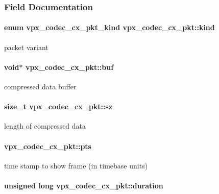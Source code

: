 \subsubsection{\-Field \-Documentation}
\hypertarget{structvpx__codec__cx__pkt_a41f395b39516343c1329a4a85a0084f2}{
\paragraph[{kind}]{\setlength{\rightskip}{0pt plus 5cm}enum {\bf vpx\-\_\-codec\-\_\-cx\-\_\-pkt\-\_\-kind} {\bf vpx\-\_\-codec\-\_\-cx\-\_\-pkt\-::kind}}}\label{structvpx__codec__cx__pkt_a41f395b39516343c1329a4a85a0084f2}
packet variant \hypertarget{structvpx__codec__cx__pkt_a9e1db068593b6037e70b05b5239784d2}{
\paragraph[{buf}]{\setlength{\rightskip}{0pt plus 5cm}void$\ast$ {\bf vpx\-\_\-codec\-\_\-cx\-\_\-pkt\-::buf}}}\label{structvpx__codec__cx__pkt_a9e1db068593b6037e70b05b5239784d2}
compressed data buffer \hypertarget{structvpx__codec__cx__pkt_a857321ba2dc65e81c430d14c36a542d9}{
\paragraph[{sz}]{\setlength{\rightskip}{0pt plus 5cm}size\-\_\-t {\bf vpx\-\_\-codec\-\_\-cx\-\_\-pkt\-::sz}}}\label{structvpx__codec__cx__pkt_a857321ba2dc65e81c430d14c36a542d9}
length of compressed data \hypertarget{structvpx__codec__cx__pkt_aa75fe039fe6b47fb25d20684864bef12}{
\paragraph[{pts}]{ {\bf vpx\-\_\-codec\-\_\-cx\-\_\-pkt\-::pts}}}\label{structvpx__codec__cx__pkt_aa75fe039fe6b47fb25d20684864bef12}
time stamp to show frame (in timebase units) \hypertarget{structvpx__codec__cx__pkt_afb8d9069980e759d97d2eb9fae7e5e06}{
\paragraph[{duration}]{\setlength{\rightskip}{0pt plus 5cm}unsigned long {\bf vpx\-\_\-codec\-\_\-cx\-\_\-pkt\-::duration}}}\label{structvpx__codec__cx__pkt_afb8d9069980e759d97d2eb9fae7e5e06}
